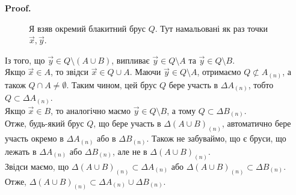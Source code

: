 \documentclass[a4paper, 10pt]{article}
\makeatletter
\def\qed{$\blacksquare$}
\theoremstyle{theoremdd}
\theoremstyle{theoremdd}
\theoremstyle{theoremdd}
\theoremstyle{theoremdd}
\theoremstyle{theoremdd}
\theoremstyle{theoremdd}
\theoremstyle{theoremdd}
\theoremstyle{theoremdd}
\theoremstyle{theoremdd}
\theoremstyle{theoremdd}
\theoremstyle{theoremdd}
\theoremstyle{theoremdd}
\theoremstyle{theoremdd}
\theoremstyle{theoremdd}
\theoremstyle{theoremdd}
\renewenvironment{proof}[1][Proof.\\]{\par
\pushQED{\hfill \qed}%
\normalfont \topsep6\p@\@plus6\p@\relax
\trivlist
\item\relax
{\bfseries
#1\@addpunct{.}}\hspace\labelsep\ignorespaces
}{%
\popQED\endtrivlist\@endpefalse
}
\makeatother
\begin{document}
\begin{proof}
\begin{enumerate}[wide=0pt,label={\arabic*)}]
\begin{figure}[H]
\caption*{Я взяв окремий блакитний брус $Q$. Тут намальовані як раз точки $\vec{x},\vec{y}$.}
\end{figure}
\iffalse
Якщо існують лише точки $\vec{x} \in Q \cap (A \cup B)$, то тоді брус $Q \subset (A \cup B)$, що неможливо, оскільки $Q \not\subset (A \cup B)_{(n)}$. Якщо існують лише точки $\vec{y} \in Q \setminus (A \cup B)$, то тоді $Q \cap (A \cup B) = \emptyset$, що теж неможливо.
\fi
Із того, що $\vec{y} \in Q \setminus (A \cup B)$, випливає $\vec{y} \in Q \setminus A$ та $\vec{y} \in Q \setminus B$.\\
Якщо $\vec{x} \in A$, то звідси $\vec{x} \in Q \cup A$. Маючи $\vec{y} \in Q \setminus A$, отримаємо $Q \not\subset A_{(n)}$, а також $Q \cap A \neq \emptyset$. Таким чином, цей брус $Q$ бере участь в $\Delta A_{(n)}$, тобто $Q \subset \Delta A_{(n)}$.\\
Якщо $\vec{x} \in B$, то аналогічно маємо $\vec{y} \in Q \setminus B$, а тому $Q \subset \Delta B_{(n)}$.\\
Отже, будь-який брус $Q$, що бере участь в $\Delta (A \cup B)_{(n)}$, автоматично бере участь окремо в $\Delta A_{(n)}$ або в $\Delta B_{(n)}$. Також не забуваймо, що є бруси, що лежать в $\Delta A_{(n)}$ або $\Delta B_{(n)}$, але не в $\Delta (A \cup B)_{(n)}$.\\
Звідси маємо, що $\Delta (A \cup B)_{(n)} \subset \Delta A_{(n)}$ або $\Delta (A \cup B)_{(n)} \subset \Delta B_{(n)}$. Отже, $\Delta (A \cup B)_{(n)} \subset \Delta A_{(n)} \cup \Delta B_{(n)}$.


\end{enumerate}
\end{proof}
\end{document}
